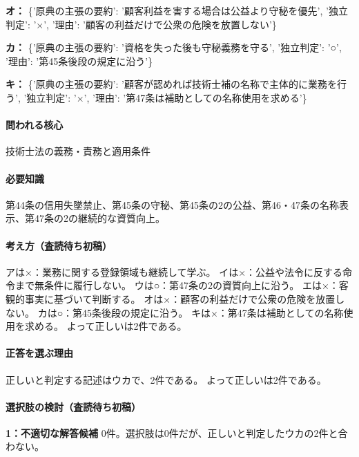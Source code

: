 \noindent\textbf{オ：} \{'原典の主張の要約': '顧客利益を害する場合は公益より守秘を優先', '独立判定': '×', '理由': '顧客の利益だけで公衆の危険を放置しない'\}\par

\noindent\textbf{カ：} \{'原典の主張の要約': '資格を失った後も守秘義務を守る', '独立判定': '○', '理由': '第45条後段の規定に沿う'\}\par

\noindent\textbf{キ：} \{'原典の主張の要約': '顧客が認めれば技術士補の名称で主体的に業務を行う', '独立判定': '×', '理由': '第47条は補助としての名称使用を求める'\}\par

\paragraph{問われる核心} 技術士法の義務・責務と適用条件

\paragraph{必要知識} 第44条の信用失墜禁止、第45条の守秘、第45条の2の公益、第46・47条の名称表示、第47条の2の継続的な資質向上。

\paragraph{考え方（査読待ち初稿）} アは×：業務に関する登録領域も継続して学ぶ。 イは×：公益や法令に反する命令まで無条件に履行しない。 ウは○：第47条の2の資質向上に沿う。 エは×：客観的事実に基づいて判断する。 オは×：顧客の利益だけで公衆の危険を放置しない。 カは○：第45条後段の規定に沿う。 キは×：第47条は補助としての名称使用を求める。 よって正しいは2件である。

\paragraph{正答を選ぶ理由} 正しいと判定する記述はウカで、2件である。  よって正しいは2件である。

\paragraph{選択肢の検討（査読待ち初稿）}\mbox{}\par

\noindent\textbf{1：不適切な解答候補} 0件。選択肢は0件だが、正しいと判定したウカの2件と合わない。\par

